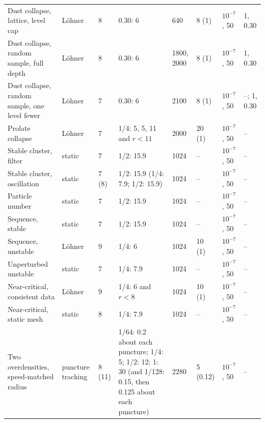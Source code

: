 \begin{table}
\begin{ruledtabular}
\begin{tabular}{p{}p{}p{}p{}p{}p{}p{}p{}}
\raggedright Dust collapse, lattice, level cap & \raggedright L\"ohner & \raggedright 8 & \raggedright 0.30: 6 & \raggedright 640 & \raggedright 8 (1) & \raggedright $10^{-7}$, 50 & \raggedright 1, 0.30 \tabularnewline
\raggedright Dust collapse, random sample, full depth & \raggedright L\"ohner & \raggedright 8 & \raggedright 0.30: 6 & \raggedright 1800, 2000 & \raggedright 8 (1) & \raggedright $10^{-7}$, 50 & \raggedright 1, 0.30 \tabularnewline
\raggedright Dust collapse, random sample, one level fewer & \raggedright L\"ohner & \raggedright 7 & \raggedright 0.30: 6 & \raggedright 2100 & \raggedright 8 (1) & \raggedright $10^{-7}$, 50 & \raggedright --; 1, 0.30 \tabularnewline
\raggedright Prolate collapse & \raggedright L\"ohner & \raggedright 7 & \raggedright 1/4: 5, 5, 11 and $r<11$ & \raggedright 2000 & \raggedright 20 (1) & \raggedright $10^{-7}$, 50 & \raggedright -- \tabularnewline
\raggedright Stable cluster, filter & \raggedright static & \raggedright 7 & \raggedright 1/2: 15.9 & \raggedright 1024 & \raggedright -- & \raggedright $10^{-7}$, 50 & \raggedright -- \tabularnewline
\raggedright Stable cluster, oscillation & \raggedright static & \raggedright 7 (8) & \raggedright 1/2: 15.9 (1/4: 7.9; 1/2: 15.9) & \raggedright 1024 & \raggedright -- & \raggedright $10^{-7}$, 50 & \raggedright -- \tabularnewline
\raggedright Particle number & \raggedright static & \raggedright 7 & \raggedright 1/2: 15.9 & \raggedright 1024 & \raggedright -- & \raggedright $10^{-7}$, 50 & \raggedright -- \tabularnewline
\raggedright Sequence, stable & \raggedright static & \raggedright 7 & \raggedright 1/2: 15.9 & \raggedright 1024 & \raggedright -- & \raggedright $10^{-7}$, 50 & \raggedright -- \tabularnewline
\raggedright Sequence, unstable & \raggedright L\"ohner & \raggedright 9 & \raggedright 1/4: 6 & \raggedright 1024 & \raggedright 10 (1) & \raggedright $10^{-7}$, 50 & \raggedright -- \tabularnewline
\raggedright Unperturbed unstable & \raggedright static & \raggedright 7 & \raggedright 1/4: 7.9 & \raggedright 1024 & \raggedright -- & \raggedright $10^{-7}$, 50 & \raggedright -- \tabularnewline
\raggedright Near-critical, consistent data & \raggedright L\"ohner & \raggedright 9 & \raggedright 1/4: 6 and $r<8$ & \raggedright 1024 & \raggedright 10 (1) & \raggedright $10^{-7}$, 50 & \raggedright -- \tabularnewline
\raggedright Near-critical, static mesh & \raggedright static & \raggedright 8 & \raggedright 1/4: 7.9 & \raggedright 1024 & \raggedright -- & \raggedright $10^{-7}$, 50 & \raggedright -- \tabularnewline
\raggedright Two overdensities, speed-matched radius & \raggedright puncture tracking & \raggedright 8 (11) & \raggedright 1/64: 0.2 about each puncture; 1/4: 5; 1/2: 12; 1: 30 (and 1/128: 0.15, then 0.125 about each puncture) & \raggedright 2280 & \raggedright 5 (0.12)\footnotemark[4] & \raggedright $10^{-7}$, 50 & \raggedright -- \tabularnewline

\end{tabular}
\end{ruledtabular}
\end{table}
